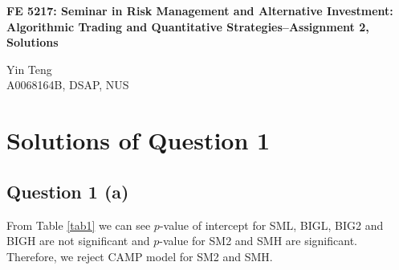 \documentclass[11pt]{article}
\begin{document}
\textbf{\Large FE 5217: Seminar in Risk Management and Alternative Investment: Algorithmic Trading and Quantitative Strategies--Assignment 2, Solutions}
\begin{center}
Yin Teng\\
A0068164B, DSAP, NUS
\end{center}
\section{Solutions of Question 1} 
\subsection{Question 1 (a)}
From Table \ref{tab1} we can see $p$-value of intercept for SML, BIGL, BIG2 and BIGH are not significant and $p$-value for SM2 and SMH are significant. Therefore, we reject CAMP model for SM2 and SMH.
\end{document}
